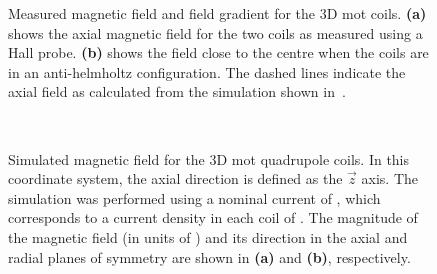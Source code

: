 \begin{figure}[!htbp]
	\centering
	\def\svgwidth{\columnwidth}
	\label{fig:mot_coil_plots}
	\label{fig:mot_coil_plots_together}
	\caption[Measured magnetic field and field gradient for the 3D \ac{mot}
		coils]{Measured magnetic field and field gradient for the 3D \ac{mot}
		coils. \textbf{(a)} shows the axial magnetic field for the two coils as
		measured using a Hall probe. \textbf{(b)} shows the field close to the centre when the coils are in an anti-helmholtz configuration. The dashed lines indicate the axial field as
		calculated from the simulation shown
		in~.}
	
\end{figure}
\begin{figure}[!htbp]
	\centering
	\def\svgwidth{\columnwidth}
	\\
	\caption[Simulated magnetic field for the 3D \ac{mot} quadrupole
		coils]{Simulated magnetic field for the 3D \ac{mot} quadrupole coils. In
		this coordinate system, the axial direction is defined as the
		\(\vec{z}\) axis. The simulation was performed using a nominal current
		of , which corresponds to a current density in
		each coil of . The
		magnitude of the magnetic field (in units of \sivalue{}{\gauss}) and its
		direction in the axial and radial planes of symmetry are shown in
		\textbf{(a)} and
		\textbf{(b)}, respectively.}
	\label{fig:3D_mot_field_sim}
\end{figure}
